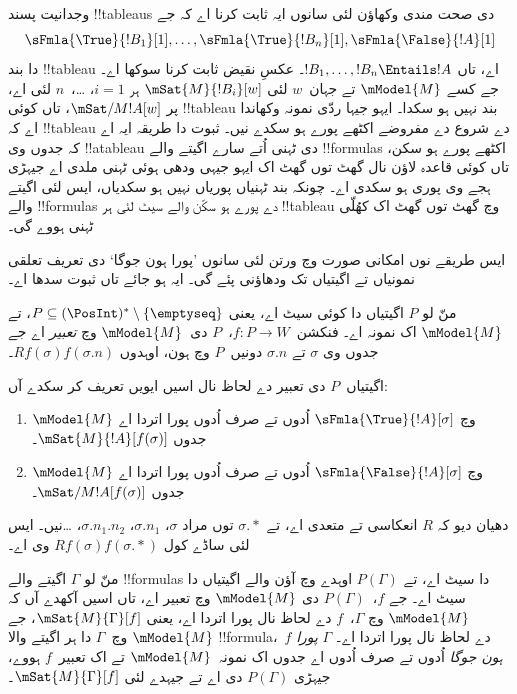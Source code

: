 \documentclass[../../../include/open-logic-section]{subfiles}
\begin{document}


\begin{explain}
  وجدانیت پسند !!{tableau}s دی صحت مندی وکھاؤن لئی سانوں ایہ ثابت کرنا اے
  کہ جے
  \[
  \sFmla{\True}{!B_1}[1], \dots, \sFmla{\True}{!B_n}[1], \sFmla{\False}{!A}[1]
  \]
  دا بند !!{tableau} اے، تاں $!B_1, \dots, !B_n \Entails !A$۔ عکسِ نقیض
  ثابت کرنا سوکھا اے۔ جے کسے $\mModel{M}$ تے جہان~$w$ لئی
  $\mSat{M}{!B_i}[w]$ ہر $i=1$، \dots،~$n$ لئی اے، پر $\mSat/{M}{!A}[w]$،
  تاں کوئی !!{tableau} بند نہیں ہو سکدا۔ ایہو جیہا ردّی نمونہ وکھاندا اے
  کہ !!{tableau} دے شروع دے مفروضے اکٹھے پورے ہو سکدے نیں۔ ثبوت دا طریقہ
  ایہ اے کہ جدوں وی !!a{tableau} دی ٹہنی اُتے سارے اگیتے والے
  !!{formula}s اکٹھے پورے ہو سکن، تاں کوئی قاعدہ لاؤن نال گھٹ توں گھٹ
  اک ایہو جیہی ودھی ہوئی ٹہنی ملدی اے جیہڑی ہجے وی پوری ہو سکدی اے۔
  چونکہ بند ٹہنیاں پوریاں نہیں ہو سکدیاں، ایس لئی اگیتے والے !!{formula}s دے
  پورے ہو سکّن والے سیٹ لئی ہر !!{tableau} وچ گھٹ توں گھٹ اک کھُلّی ٹہنی ہووے گی۔

  ایس طریقے نوں امکانی صورت وچ ورتن لئی سانوں ’پورا ہون جوگا‘ دی تعریف
  تعلقی نمونیاں تے اگیتیاں تک ودھاؤنی پئے گی۔ ایہ ہو جائے تاں ثبوت سدھا اے۔
\end{explain}

\begin{defn}
  منّ لو $P$ اگیتیاں دا کوئی سیٹ اے، یعنی $P \subseteq (\PosInt)^*
  \setminus \{\emptyseq\}$، تے $\mModel{M}$ اک نمونہ اے۔
  فنکشن~$f\colon P \to W$،~$P$ دی~$\mModel{M}$ وچ \emph{تعبیر} اے جے
  جدوں وی $\sigma$ تے $\sigma.n$ دونیں~$P$ وچ ہون، اوہدوں $Rf(\sigma)f(\sigma.n)$۔

  اگیتیاں~$P$ دی تعبیر دے لحاظ نال اسیں ایویں تعریف کر سکدے آں:
  \begin{enumerate}
  \item $\mModel{M}$ وچ $\sFmla{\True}{!A}[\sigma]$ اُدوں تے صرف اُدوں
    پورا اتردا اے جدوں $\mSat{M}{!A}[f(\sigma)]$۔
  \item $\mModel{M}$ وچ $\sFmla{\False}{!A}[\sigma]$ اُدوں تے صرف اُدوں
    پورا اتردا اے جدوں $\mSat/{M}{!A}[f(\sigma)]$۔
  \end{enumerate}
\end{defn}

دھیان دیو کہ $R$ انعکاسی تے متعدی اے، تے $\sigma.{*}$ توں مراد
$\sigma$، $\sigma.n_1$، $\sigma.n_1.n_2$، \dots نیں۔ ایس لئی ساڈے کول
$Rf(\sigma)f(\sigma.{*})$ وی اے۔

\begin{defn}
  منّ لو $\Gamma$ اگیتے والے !!{formula}s دا سیٹ اے، تے $P(\Gamma)$
  اوہدے وچ آؤن والے اگیتیاں دا سیٹ اے۔ جے $f$،~$P(\Gamma)$ دی
  $\mModel{M}$ وچ تعبیر اے، تاں اسیں آکھدے آں کہ $\mModel{M}$ وچ
  $\Gamma$،~$f$ دے لحاظ نال پورا اتردا اے، یعنی $\mSat{M}{\Gamma}[f]$،
  جے $\mModel{M}$ وچ~$\Gamma$ دا ہر اگیتے والا !!{formula}،~$f$ دے لحاظ نال
  پورا اتردا اے۔ $\Gamma$ \emph{پورا ہون جوگا} اُدوں تے صرف اُدوں اے جدوں
  اک نمونہ~$\mModel{M}$ تے اک تعبیر~$f$ ہووے، جیہڑی $P(\Gamma)$ دی اے تے جیہدے لئی
  $\mSat{M}{\Gamma}[f]$۔
\end{defn}
\end{document}
